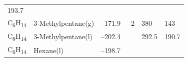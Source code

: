 \documentclass[
  9pt,
]{extbook}
\theoremstyle{definition}
\theoremstyle{definition}
\theoremstyle{definition}
\theoremstyle{remark}
\begin{document}
\begin{longtable}[]{@{}llllll@{}}
\begin{minipage}[t]{0.14\columnwidth}
193.7\strut
\end{minipage}\tabularnewline
\begin{minipage}[t]{0.07\columnwidth}\raggedright
C\textsubscript{6}H\textsubscript{14}\strut
\end{minipage} & \begin{minipage}[t]{0.17\columnwidth}\raggedright
3-Methylpentane(g)\strut
\end{minipage} & \begin{minipage}[t]{0.15\columnwidth}\raggedright
--171.9\strut
\end{minipage} & \begin{minipage}[t]{0.15\columnwidth}\raggedright
--2\strut
\end{minipage} & \begin{minipage}[t]{0.14\columnwidth}\raggedright
380\strut
\end{minipage} & \begin{minipage}[t]{0.14\columnwidth}\raggedright
143\strut
\end{minipage}\tabularnewline
\begin{minipage}[t]{0.07\columnwidth}\raggedright
C\textsubscript{6}H\textsubscript{14}\strut
\end{minipage} & \begin{minipage}[t]{0.17\columnwidth}\raggedright
3-Methylpentane(l)\strut
\end{minipage} & \begin{minipage}[t]{0.15\columnwidth}\raggedright
--202.4\strut
\end{minipage} & \begin{minipage}[t]{0.15\columnwidth}\raggedright
\strut
\end{minipage} & \begin{minipage}[t]{0.14\columnwidth}\raggedright
292.5\strut
\end{minipage} & \begin{minipage}[t]{0.14\columnwidth}\raggedright
190.7\strut
\end{minipage}\tabularnewline
\begin{minipage}[t]{0.07\columnwidth}\raggedright
C\textsubscript{6}H\textsubscript{14}\strut
\end{minipage} & \begin{minipage}[t]{0.17\columnwidth}\raggedright
Hexane(l)\strut
\end{minipage} & \begin{minipage}[t]{0.15\columnwidth}\raggedright
--198.7\strut
\end{minipage} & \begin{minipage}[t]{0.15\columnwidth}\raggedright

\end{minipage}
\end{longtable}
\end{document}
